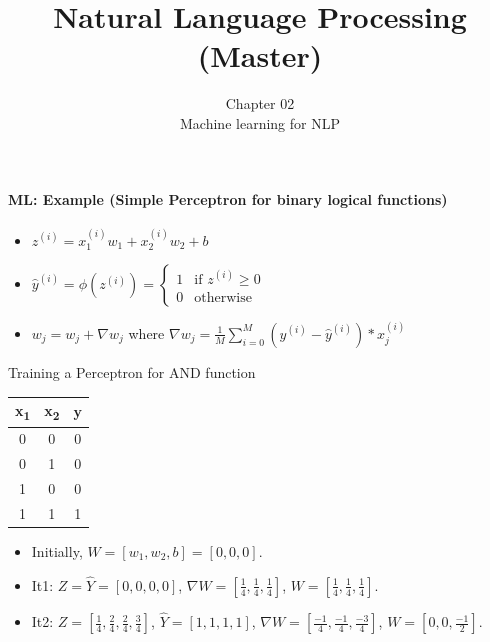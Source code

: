 \documentclass[xcolor=table]{beamer}
\title[ESI - NLP(master)]%
{Natural Language Processing (Master)}
\subtitle[02- ML for NLP]%
{Chapter 02\\Machine learning for NLP}
\begin{document}
	
\begin{frame}
	\frametitle{\inserttitle}
	\framesubtitle{ML: Example (Simple Perceptron for binary logical functions)}
	
	\begin{minipage}{0.30\textwidth} 
	\end{minipage}
	\begin{minipage}{0.59\textwidth}
		\scriptsize
		\begin{itemize}
			\item $ z^{(i)} = x_1^{(i)} w_1 + x_2^{(i)} w_2 + b $
			\item $ \hat{y}^{(i)} = \phi(z^{(i)}) = \begin{cases}
				1 & \text{if } z^{(i)} \ge 0 \\
				0 & \text{otherwise}
			\end{cases} $
			\item $ w_j = w_j + \nabla w_j$ where $ \nabla w_j = \frac{1}{M}\sum_{i=0}^{M} (y^{(i)} - \hat{y}^{(i)}) * x_j^{(i)} $
		\end{itemize}
	\end{minipage}
	
	\vfill
	
	\begin{exampleblock}{Training a Perceptron for AND function}
		\begin{minipage}{0.2\textwidth} 
			\scriptsize
			\begin{tabular}{|c|c|c|}
				\hline
				x\textsubscript{1} & x\textsubscript{2} & y \\
				\hline
				0 & 0 & 0  \\
				\hline
				0 & 1 & 0 \\
				\hline
				1 & 0 & 0 \\
				\hline
				1 & 1 & 1 \\
				\hline
			\end{tabular}
		\end{minipage}
		\begin{minipage}{0.79\textwidth}
			\scriptsize
			\begin{itemize}
				\item Initially, $ W = [w_1, w_2, b] = [0, 0, 0] $.
				
				\item It1: $ Z = \hat{Y} = [0, 0, 0, 0] $, 
				$ \nabla W = [\frac{1}{4}, \frac{1}{4}, \frac{1}{4}] $, 
				$ W = [\frac{1}{4}, \frac{1}{4}, \frac{1}{4}] $.
				
				\item It2: $ Z = [\frac{1}{4}, \frac{2}{4}, \frac{2}{4}, \frac{3}{4}] $, 
				$ \hat{Y} = [1, 1, 1, 1] $, 
				$ \nabla W = [\frac{-1}{4}, \frac{-1}{4}, \frac{-3}{4}] $,
				$ W = [0, 0, \frac{-1}{2}] $.
				

\end{itemize}
\end{minipage}
\end{exampleblock}
\end{frame}
\end{document}
